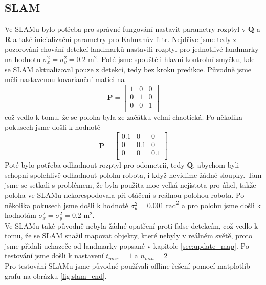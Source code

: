 \documentclass[a4paper,12pt]{article}
\begin{document}
\subsection{SLAM}
Ve SLAMu bylo potřeba pro správné fungování nastavit parametry rozptyl v $\mathbf Q$ a $\mathbf R$ a také inicializační parametry pro Kalmanův filtr. 
Nejdříve jsme tedy z pozorování chování detekcí landmarků nastavili rozptyl pro jednotlivé landmarky na hodnotu $\sigma_x^2 = \sigma_v^2 = 0.2 \text{ m}^2$. Poté jsme spouštěli hlavní kontrolní smyčku, kde se SLAM aktualizoval pouze z detekcí, tedy bez kroku predikce.
Původně jsme měli nastavenou kovarianční matici na 
\[
\mathbf P = \begin{bmatrix}
    1 & 0 & 0 \\
    0 & 1 & 0 \\
    0 & 0 & 1 \\
\end{bmatrix}
\]
což vedlo k tomu, že se poloha byla ze začátku velmi chaotická. Po několika pokusech jsme došli k hodnotě 
\[
\mathbf P = \begin{bmatrix}
    0.1 & 0 & 0 \\
    0 & 0.1 & 0 \\
    0 & 0 & 0.1 \\
\end{bmatrix}
\]
Poté bylo potřeba odhadnout rozptyl pro odometrii, tedy $\mathbf Q$, abychom byli schopni spolehlivě odhadnout polohu robota, i když nevidíme žádné sloupky. Tam jsme se setkali s problémem, 
že byla použita moc velká nejistota pro úhel, takže poloha ve SLAMu nekorespodovala při otáčení s reálnou polohou robota. Po několika pokusech jsme došli k hodnotě $\sigma_\theta^2 = 0.001 \text{ rad}^2$ a pro polohu jsme došli k hodnotám $\sigma_{x}^2 = \sigma_{y}^2 = 0.2 \text{ m}^2$.\\

Ve SLAMu také původně nebyla žádné opatření proti false detekcím, což vedlo k tomu, že se SLAM snažil mapovat objekty, které nebyly v reálném světě, proto jsme přidali uchazeče od landmarky popsané v kapitole \ref{sec:update_map}. Po testování jsme došli k nastavení $t_{max} = 1$ a $n_{min} = 2$\\

Pro testování SLAMu jsme původně používali offline řešení pomocí matplotlib grafu na obrázku \ref{fig:slam_end}. \\
\end{document}
